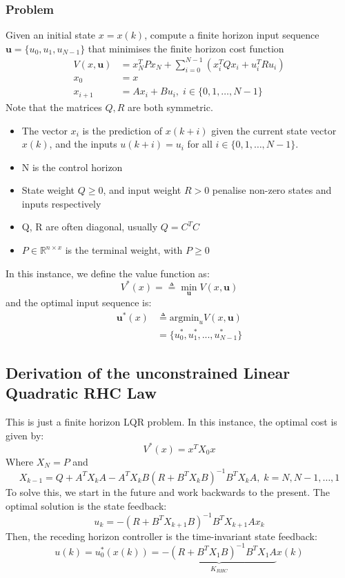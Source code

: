 \documentclass{article}
\begin{document}
\subsubsection*{Problem}
Given an initial state $x = x(k)$, compute a finite horizon input sequence $\textbf{u} = \{ u_0,u_1,u_{N-1}\}$ that minimises the finite horizon cost function
\[
\begin{aligned}
V(x,\textbf{u}) &= x_N^TPx_N + \sum_{i=0}^{N-1}(x_i^TQx_i + u_i^TR u_i) \\
x_0 &= x \\
x_{i+1} &= Ax_i + Bu_i, \; i \in \{0,1,\hdots,N-1\}
\end{aligned}
\]
Note that the matrices $Q,R$ are both symmetric.
\begin{itemize}
    \item The vector $x_i$ is the prediction of $x(k+i)$ given the current state vector $x(k)$, and the inputs $u(k+i) = u_i$ for all $i \in \{0,1,\hdots,N-1\}$. 
    \item N is the control horizon
    \item State weight $Q \geq 0$, and input weight $R > 0$ penalise non-zero states and inputs respectively
    \item Q, R are often diagonal, usually $Q = C^TC$
    \item $P \in \mathbb{R}^{n \times x}$ is the terminal weight, with $P \geq 0$
\end{itemize}
In this instance, we define the value function as:
\[
V^*(x) = \triangleq \min_{\textbf{u}} V(x,\textbf{u})
\]
and the optimal input sequence is:
\[
\begin{aligned}
\textbf{u}^*(x) &\triangleq \text{argmin}_u V(x,\textbf{u}) \\
&= \{ u_0^*,u_1^*,...,u_{N-1}^*\}
\end{aligned}
\]
\subsection{Derivation of the unconstrained Linear Quadratic RHC Law}
This is just a finite horizon LQR problem. In this instance, the optimal cost is given by:
\[
V^*(x) = x^T X_0 x
\]
Where $X_N=P$ and 
\[
X_{k-1} = Q+ A^TX_kA - A^TX_kB(R+B^TX_kB)^{-1}B^TX_kA, \; k=N,N-1,\hdots,1
\]
To solve this, we start in the future and work backwards to the present. The optimal solution is the state feedback:
\[
u_k = -(R + B^TX_{k+1}B)^{-1}B^TX_{k+1}Ax_k
\]
Then, the receding horizon controller is the time-invariant state feedback:
\[
u(k) = u_0^*(x(k)) = \underbrace{-(R+B^TX_1B)^{-1}B^TX_1A}_{K_{RHC}}x(k)
\]
\end{document}
